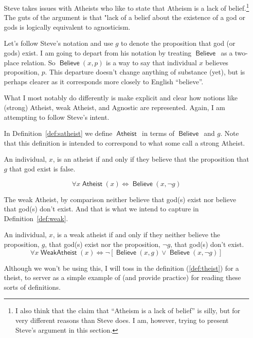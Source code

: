 \documentclass[12pt]{article}
\providecommand{\lor}{\vee}
\providecommand{\liff}{\iff}
\providecommand{\lnot}{\neg}
\providecommand{\lall}{\forall}
\newcommand{\rel}[1]{\ensuremath{\mathop{\mathsf{#1}}}}
\newcommand{\rlbelieve}{\rel{Believe}}
\newcommand{\rlatheist}{\rel{Atheist}}
\newcommand{\rlwa}{\rel{WeakAtheist}}
\begin{document}
Steve takes issues with Atheists who like to state that Atheism is a lack of belief.\footnote{I also think that the claim that “Atheism is a lack of belief” is silly, but for very different reasons than Steve does. I am, however, trying to present Steve's argument in this section.}
The guts of the argument is that "lack of a belief about the existence of a god or gods is logically equivalent to agnosticism.

Let's follow Steve's notation and use $g$ to denote the proposition that god (or gods) exist.
I am going to depart from his notation by treating \rlbelieve\ as a two-place relation. So $\rlbelieve(x, p)$ is a way to say that individual $x$ believes proposition, $p$. This departure doesn't change anything of substance (yet), but is perhaps clearer as it corresponds more closely to English “believe”.

What I most notably do differently is make explicit and clear how notions like (strong) Atheist, weak Atheist, and Agnostic are represented. Again, I am attempting to follow Steve's intent.

In Definition~\ref{def:satheist} we define  \rlatheist\ in terms of \rlbelieve\ and $g$. Note that this definition is intended to correspond to what some call a strong Atheist.

\begin{definition}[Atheist]\label{def:satheist}
    An individual, $x$, is an atheist if and only if they believe that the proposition that $g$ that god exist is false.

    \[
        \lall x \rlatheist(x) \liff \rlbelieve(x, \lnot g)
    \]
\end{definition}

The weak Atheist, by comparison neither believe that god(s) exist nor believe that god(s) don't exist. And that is what we intend to capture in Definition~\ref{def:weak}.

\begin{definition}\label{def:weak}
    An individual, $x$, is a weak atheist if and only if they neither believe the proposition, $g$, that god(s) exist nor the proposition, $\lnot g$, that god(s) don't exist.
    \[
        \lall x \rlwa(x) \liff
          \lnot\left[\rlbelieve(x, g) \lor \rlbelieve(x, \lnot g)\right]
    \]
\end{definition}

Although we won't be using this, I will toss in the definition (\ref{def:theist}) for a theist, to server as a simple example of (and provide practice) for reading these sorts of definitions.
\end{document}
